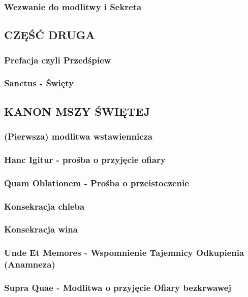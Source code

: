 \documentclass[10pt,titlepage]{article}
\begin{document}
	\subsubsection{Wezwanie do modlitwy i Sekreta}
	
	\subsection{CZĘŚĆ DRUGA}
	
	\subsubsection{Prefacja czyli Przedśpiew}
	\subsubsection{Sanctus - Święty}
	
	\subsection{KANON MSZY ŚWIĘTEJ}
	
	\subsubsection{(Pierwsza) modlitwa wstawiennicza}
	\subsubsection{Hanc Igitur - prośba o przyjęcie ofiary}
	\subsubsection{Quam Oblationem - Prośba o przeistoczenie}
	\subsubsection{Konsekracja chleba}
	\subsubsection{Konsekracja wina}
	\subsubsection{Unde Et Memores - Wspomnienie Tajemnicy Odkupienia (Anamneza)}
	\subsubsection{Supra Quae - Modlitwa o przyjęcie Ofiary bezkrwawej}
\end{document}
